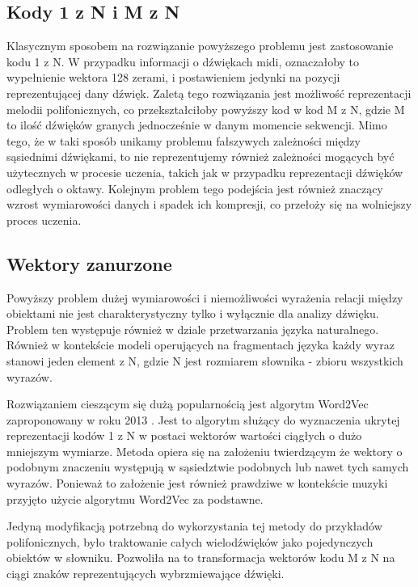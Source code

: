 {{        \subsection{Kody 1 z N i M z N}
        {
            Klasycznym sposobem na rozwiązanie powyższego problemu jest zastosowanie kodu 1 z N. W przypadku
            informacji o dźwiękach midi, oznaczałoby to wypełnienie wektora 128 zerami, i postawieniem jedynki na 
            pozycji reprezentującej dany dźwięk. 
            Zaletą tego rozwiązania jest możliwość reprezentacji melodii polifonicznych, co przekształciłoby
            powyższy kod w kod M z N, gdzie M to ilość dźwięków granych jednocześnie w danym momencie sekwencji.
            Mimo tego, że w taki sposób unikamy problemu fałszywych zależności między sąsiednimi dźwiękami, 
            to nie reprezentujemy również zależności mogących być użytecznych w procesie uczenia, 
            takich jak w przypadku reprezentacji dźwięków odległych o oktawy. 
            Kolejnym problem tego podejścia jest również znaczący wzrost wymiarowości danych i spadek ich kompresji,
            co przełoży się na wolniejszy proces uczenia.
        }

        \subsection{Wektory zanurzone}
        {
            Powyższy problem dużej wymiarowości i niemożliwości wyrażenia relacji między obiektami nie jest
            charakterystyczny tylko i wyłącznie dla analizy dźwięku. Problem ten występuje również w dziale
            przetwarzania języka naturalnego. Również w kontekście modeli operujących na fragmentach języka każdy wyraz stanowi
            jeden element z N, gdzie N jest rozmiarem słownika - zbioru wszystkich wyrazów.

            Rozwiązaniem cieszącym się dużą popularnością jest algorytm Word2Vec zaproponowany w roku 2013 \cite{Mikolov2013EfficientEO}.
            Jest to algorytm służący do wyznaczenia ukrytej reprezentacji kodów 1 z N w postaci wektorów wartości ciągłych
            o dużo mniejszym wymiarze. Metoda opiera się na założeniu twierdzącym że wektory 
            o podobnym znaczeniu występują w sąsiedztwie podobnych lub nawet tych samych wyrazów. Ponieważ to założenie 
            jest również prawdziwe w kontekście muzyki przyjęto użycie algorytmu Word2Vec za podstawne.
            
            Jedyną modyfikacją potrzebną do wykorzystania tej metody do przykładów polifonicznych, było traktowanie 
            całych wielodźwięków jako pojedynczych obiektów w słowniku. Pozwoliła na to transformacja wektorów kodu 
            M z N na ciągi znaków reprezentujących wybrzmiewające dźwięki.
        }
    }

}
